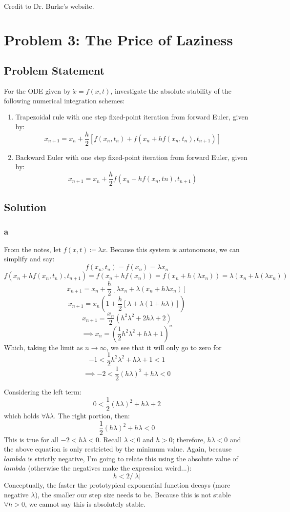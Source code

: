 \documentclass[11pt]{report}
\theoremstyle{definition}
\begin{document}
\noindent
Credit to Dr. Burke's website\cite{Burke_2007}.

\newpage
\section*{Problem 3: The Price of Laziness}
\subsection*{Problem Statement}
For the ODE given by $\dot{x}=f(x,t)$, investigate the absolute stability of the
following numerical integration schemes:
\begin{enumerate}
	\item Trapezoidal rule with one step fixed-point iteration from forward Euler, given by:
	      \[x_{n+1}=x_n+\frac{h}{2}[f(x_n,t_n)+f(x_n+hf(x_n,t_n), t_{n+1})]\]
	\item Backward Euler with one step fixed-point iteration from forward Euler, given by:
	      \[x_{n+1}=x_n+\frac{h}{2}f(x_n+hf(x_n,tn),t_{n+1})\]
\end{enumerate}

\subsection*{Solution}
\subsubsection*{a}
From the notes, let $f(x, t)\coloneqq \lambda x$. Because this system is
autonomous, we can simplify and say:
\[f(x_n, t_n) = f(x_n) = \lambda x_n\]
\[f(x_n+hf(x_n,t_n), t_{n+1}) = f(x_n+hf(x_n))=f(x_n+h(\lambda x_n)) = \lambda(x_n+h(\lambda x_n))\]
\[ x_{n+1}=x_n+\frac{h}{2}[\lambda x_n+\lambda(x_n+h\lambda x_n)] \]
\[ x_{n+1}=x_n(1+\frac{h}{2}[\lambda +\lambda(1+h\lambda)]) \]
\[ x_{n+1}=\frac{x_n}{2}(h^2\lambda^2+2h\lambda+2)\]
\[\implies x_n = (\frac{1}{2}h^2\lambda^2+h\lambda+1)^n\]
Which, taking the limit as $n\rightarrow\infty$, we see that it will only go to zero for
\[-1<\frac{1}{2}h^2\lambda^2+h\lambda+1<1\]
\[\implies-2<\frac{1}{2}(h\lambda)^2+h\lambda<0\]

Considering the left term:
\[0 < \frac{1}{2}(h\lambda)^2+h\lambda+2\]
which holds $\forall h\lambda$. The right portion, then:
\[\frac{1}{2}(h\lambda)^2+h\lambda < 0\]
This is true for all $-2<h\lambda<0$.
Recall $\lambda < 0$ and $h>0$; therefore, $h\lambda<0$ and the above equation
is only restricted by the minimum value. Again, because $lambda$ is strictly negative, I'm going to
relate this using the absolute value of $lambda$ (otherwise the negatives make the expression weird...):
\[h<2/|\lambda|\]
Conceptually, the faster the prototypical exponential function decays (more
negative $\lambda$), the smaller our step size needs to be.
Because this is not stable $\forall h>0$, we cannot say this is absolutely stable.
\end{document}
